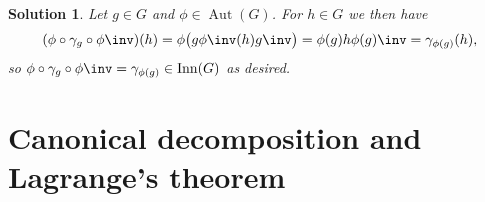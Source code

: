 \documentclass[article, a4paper, 11pt, oneside]{memoir}
\numberwithin{equation}{chapter}
\theoremstyle{nonumberplain}
\newtheorem{solution}{Solution}
\DeclareMathOperator{\Aut}{Aut}
\DeclareMathOperator{\Inn}{Inn}
\begin{document}
\begin{solution}
    Let $g \in G$ and $\phi \in \Aut(G)$. For $h \in G$ we then have
    \begin{equation*}
        (\phi \circ \gamma_g \circ \phi\inv)(h)
            = \phi \bigl( g \phi\inv(h) g\inv \bigr)
            = \phi(g) h \phi(g)\inv
            = \gamma_{\phi(g)}(h),
    \end{equation*}
    so $\phi \circ \gamma_g \circ \phi\inv = \gamma_{\phi(g)} \in \Inn(G)$ as desired.
\end{solution}



\section{Canonical decomposition and Lagrange's theorem}
\end{document}
